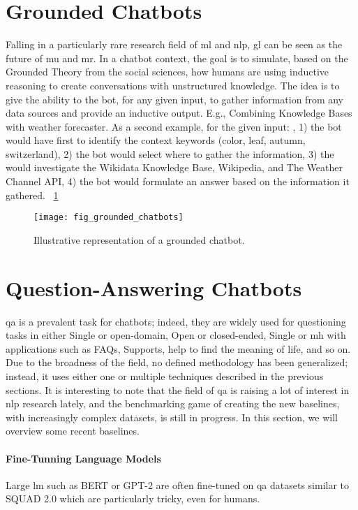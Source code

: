 \section{Grounded Chatbots}
\label{chatbot:grounded}
Falling in a particularly rare research field of \gls{ml} and \gls{nlp}, \gls{gl} can be seen as the future of \gls{mu} and \gls{mr}. In a chatbot context, the goal is to simulate, based on the Grounded Theory from the social sciences, how humans are using inductive reasoning to create conversations with unstructured knowledge. The idea is to give the ability to the bot, for any given input, to gather information from any data sources and provide an inductive output. E.g., Combining Knowledge Bases with weather forecaster. As a second example, for the given input: , 1) the bot would have first to identify the context keywords (color, leaf, autumn, switzerland), 2) the bot would select where to gather the information, 3) the would investigate the Wikidata Knowledge Base, Wikipedia, and The Weather Channel API, 4) the bot would formulate an answer based on the information it gathered. ~\ref{fig:fig_grounded_chatbots}

\begin{figure}
    \centering
    \texttt{[image: fig\_grounded\_chatbots]}
    \caption{Illustrative representation of a grounded chatbot.}
    \label{fig:fig_grounded_chatbots}
\end{figure}

\section{Question-Answering Chatbots}
\label{chatbot:qa}
\gls{qa} is a prevalent task for chatbots; indeed, they are widely used for questioning tasks in either Single or \gls{open-domain}, Open or \gls{closed-ended}, Single or \gls{mh} with applications such as FAQs, Supports, help to find the meaning of life, and so on. Due to the broadness of the field, no defined methodology has been generalized; instead, it uses either one or multiple techniques described in the previous sections. It is interesting to note that the field of \gls{qa} is raising a lot of interest in \gls{nlp} research lately, and the benchmarking game of creating the new baselines, with increasingly complex datasets, is still in progress. In this section, we will overview some recent baselines.

\paragraph{Fine-Tunning Language Models} Large \gls{lm} such as BERT \autocite{paper:devlin-etal-2019-bert} or GPT-2 \autocite{papers:gpt2} are often fine-tuned on \gls{qa} datasets similar to SQUAD 2.0 \autocite{paper:rajpurkar-etal-2018-know} which are particularly tricky, even for humans.

